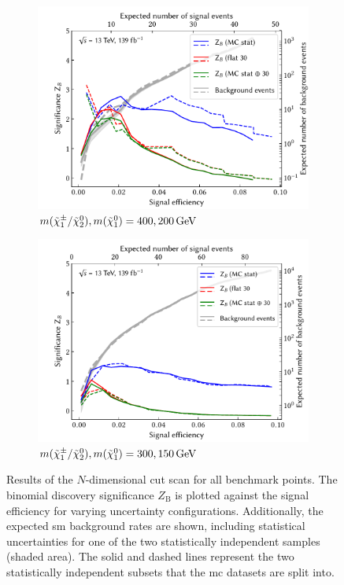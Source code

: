 \begin{figure}[hb]
	\par\bigskip
	\begin{subfigure}[b]{0.5\linewidth}
		\centering\includegraphics[width=1.0\textwidth]{N-1_cut_scan/z_vs_effs_400_200.pdf}
		\caption{$m(\charg/\neutr), m(\lsp) =  400, \SI{200}{\GeV}$}
	\end{subfigure}\hfill
	\begin{subfigure}[b]{0.5\linewidth}
		\centering\includegraphics[width=1.0\textwidth]{N-1_cut_scan/z_vs_effs_300_150.pdf}
		\caption{$m(\charg/\neutr), m(\lsp) =  300, \SI{150}{\GeV}$}
	\end{subfigure}\hfill

	\caption[N-dimensional cut scan results]{Results of the $N$-dimensional cut scan for all benchmark points. The binomial discovery significance $Z_\mathrm{B}$ is plotted against the signal efficiency for varying uncertainty configurations. Additionally, the expected \gls{sm} background rates are shown, including statistical uncertainties for one of the two statistically independent samples (shaded area). The solid and dashed lines represent the two statistically independent subsets that the \gls{mc} datasets are split into.}
	\label{fig:results_z_vs_eff_rest}
\end{figure}



